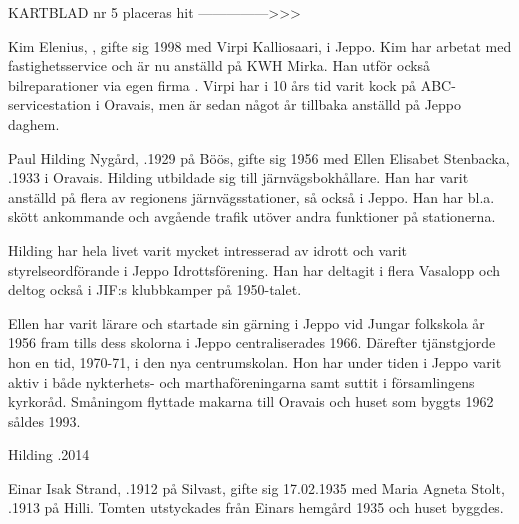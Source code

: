 

KARTBLAD nr 5 placeras hit --------------->>>




Kim Elenius, , gifte sig 1998 med Virpi Kalliosaari,  i Jeppo. Kim har arbetat med fastighetsservice och är nu anställd på KWH Mirka.  Han utför också bilreparationer via egen firma . Virpi har i 10 års tid varit kock på ABC-servicestation i Oravais, men är sedan något år tillbaka anställd på Jeppo daghem.


\begin{jhchildren}
  \item {}
  \item {}
\end{jhchildren}



Paul Hilding Nygård, .1929 på Böös, gifte sig 1956 med Ellen Elisabet Stenbacka, .1933 i Oravais. Hilding utbildade sig till järnvägsbokhållare. Han har varit anställd på flera av regionens järnvägsstationer, så också i Jeppo. Han har bl.a. skött ankommande och avgående trafik utöver andra  funktioner på stationerna.

Hilding har hela livet varit mycket intresserad av idrott och varit styrelseordförande i Jeppo Idrottsförening. Han har deltagit i flera Vasalopp och deltog också i JIF:s klubbkamper på 1950-talet.

Ellen har varit lärare och startade sin gärning i Jeppo vid Jungar folkskola år 1956 fram tills dess skolorna i Jeppo centraliserades 1966. Därefter tjänstgjorde hon en tid, 1970-71, i den nya centrumskolan. Hon har under tiden i Jeppo varit aktiv i både nykterhets- och marthaföreningarna samt suttit i församlingens kyrkoråd. Småningom flyttade makarna till Oravais och huset som byggts 1962 såldes 1993.

Hilding .2014




Einar Isak Strand, .1912 på Silvast, gifte sig 17.02.1935 med Maria Agneta Stolt, .1913 på Hilli. Tomten utstyckades från Einars hemgård 1935 och huset byggdes.

